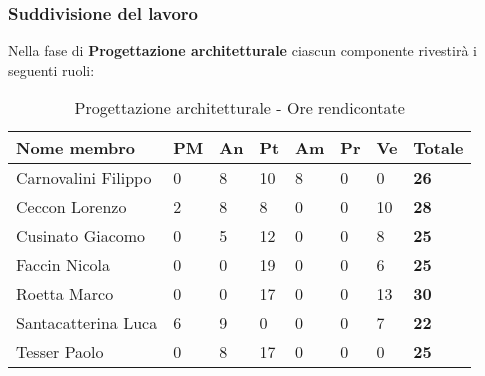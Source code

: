 		\subsubsection{Suddivisione del lavoro} %
		\label{ssub:suddivisione_del_lavoro}
		Nella fase di \textbf{Progettazione architetturale} ciascun componente rivestirà i seguenti ruoli: \\
			\begin{table}[!ht]
				\begin{center}
					\begin{tabularx}{0.9\textwidth}{|l|l|l|l|l|l|l|X|}
						\hline
						\textbf{Nome membro} & \textbf{PM} & \textbf{An} & \textbf{Pt} & \textbf{Am} & \textbf{Pr} & \textbf{Ve} & \textbf{Totale} \\
						\hline
						Carnovalini Filippo & 0 & 8 & 10 & 8 & 0 & 0 & \textbf{26} \\
						\hline
						Ceccon Lorenzo & 2 & 8 & 8 & 0 & 0 & 10 & \textbf{28} \\
						\hline
						Cusinato Giacomo & 0 & 5 & 12 & 0 & 0 & 8 & \textbf{25} \\
						\hline
						Faccin Nicola & 0 & 0 & 19 & 0 & 0 & 6 & \textbf{25} \\
						\hline
						Roetta Marco & 0 & 0 & 17 & 0 & 0 & 13 & \textbf{30} \\
						\hline
						Santacatterina Luca & 6 & 9 & 0 & 0 & 0 & 7 & \textbf{22} \\
						\hline
						Tesser Paolo & 0 & 8 & 17 & 0 & 0 & 0 & \textbf{25} \\
						\hline	
					\end{tabularx}
				\end{center}
			\caption{Progettazione architetturale - Ore rendicontate}
			\end{table}
			
